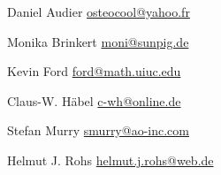 \item Daniel Audier \url{osteocool@yahoo.fr}
\item Monika Brinkert \url{moni@sunpig.de}
\item Kevin Ford \url{ford@math.uiuc.edu}
\item Claus-W. Häbel \url{c-wh@online.de}
\item Stefan Murry \url{smurry@ao-inc.com}
\item Helmut J. Rohs \url{helmut.j.rohs@web.de}


